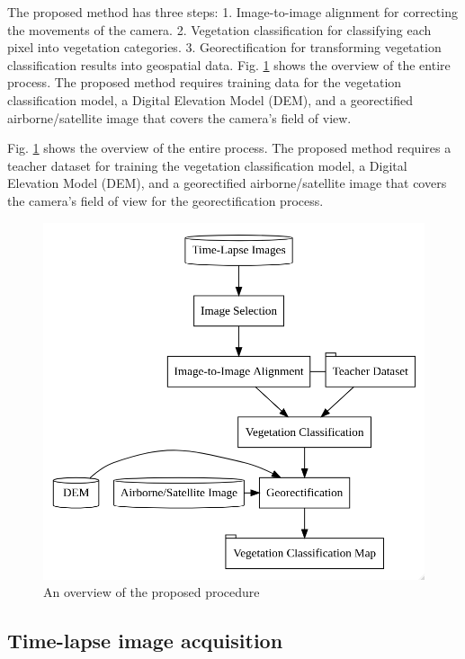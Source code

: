 \documentclass{article}
\begin{document}
The proposed method has three steps:
1. Image-to-image alignment for correcting the movements of the camera.
2. Vegetation classification for classifying each pixel into vegetation categories.
3. Georectification for transforming vegetation classification results into geospatial data.
Fig. \ref{fig:diagram} shows the overview of the entire process. The proposed method requires training data for the vegetation classification model, a Digital Elevation Model (DEM), and a georectified airborne/satellite image that covers the camera's field of view.

Fig. \ref{fig:diagram} shows the overview of the entire process. The proposed method requires a teacher dataset for training the vegetation classification model, a Digital Elevation Model (DEM), and a georectified airborne/satellite image that covers the camera's field of view for the georectification process.



\begin{figure}
\includegraphics[width=0.5\linewidth]{paper_files/figures/diagram} \caption{An overview of the proposed procedure}\label{fig:diagram}
\end{figure}

\hypertarget{time-lapse-image-acquisition}{%
\subsection{Time-lapse image acquisition}\label{time-lapse-image-acquisition}}
\end{document}
